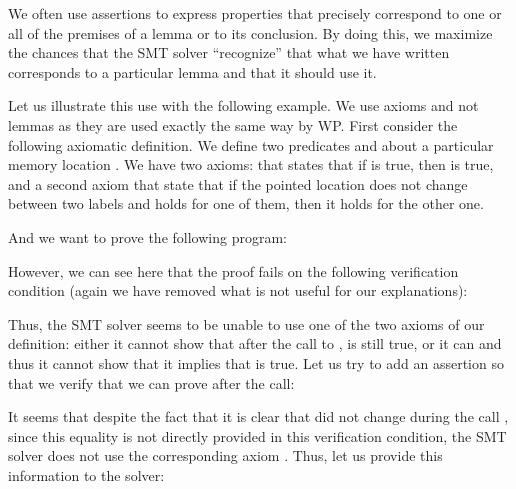 

We often use assertions to express properties that precisely correspond to one
or all of the premises of a lemma or to its conclusion. By doing this, we
maximize the chances that the SMT solver ``recognize'' that what we have written
corresponds to a particular lemma and that it should use it. 



Let us illustrate this use with the following example. We use axioms and not
lemmas as they are used exactly the same way by WP. First consider the following
axiomatic definition. We define  two predicates  and
 about a particular memory location . We have two
axioms:  that states that if  is true, then
 is true, and a second axiom  that state that
if the pointed location does not change between two labels and 
holds for one of them, then it holds for the other one.





And we want to prove the following program:




However, we can see here that the proof fails on the following verification
condition (again we have removed what is not useful for our explanations):




Thus, the SMT solver seems to be unable to use one of the two axioms of our
definition: either it cannot show that after the call to ,
 is still true, or it can and thus it cannot show that it
implies that  is true. Let us try to add an assertion so that
we verify that we can prove  after the call:








It seems that despite the fact that it is clear that  did not
change during the call , since this equality is not directly
provided in this verification condition, the SMT solver does not use the
corresponding axiom . Thus, let us provide this information to
the solver:


